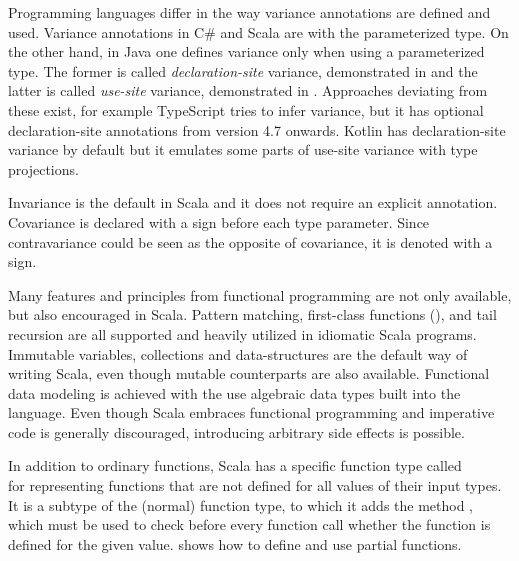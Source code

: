 

Programming languages differ in the way variance annotations are defined and used. Variance annotations in C\# and Scala are with the parameterized type. On the other hand, in Java one defines variance only when using a parameterized type. The former is called \emph{declaration-site} variance, demonstrated in  and the latter is called \emph{use-site} variance, demonstrated in . Approaches deviating from these exist, for example TypeScript tries to infer variance, but it has optional declaration-site annotations from version 4.7 onwards. Kotlin has declaration-site variance by default but it emulates some parts of use-site variance with type projections.





Invariance is the default in Scala and it does not require an explicit annotation. Covariance is declared with a \inlinecode{+} sign before each type parameter. Since contravariance could be seen as the opposite of covariance, it is denoted with a \inlinecode{-} sign.

Many features and principles from functional programming are not only available, but also encouraged in Scala. Pattern matching, first-class functions (), and tail recursion are all supported and heavily utilized in idiomatic Scala programs. Immutable variables, collections and data-structures are the default way of writing Scala, even though mutable counterparts are also available. Functional data modeling is achieved with the use algebraic data types built into the language. Even though Scala embraces functional programming and imperative code is generally discouraged, introducing arbitrary side effects is possible.



In addition to ordinary functions, Scala has a specific function type called \\ for representing functions that are not defined for all values of their input types. It is a subtype of the (normal) function type, to which it adds the method , which must be used to check before every function call whether the function is defined for the given value.  shows how to define and use partial functions.

